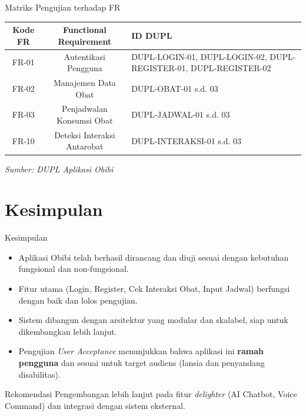 \documentclass[10pt, aspectratio=169]{beamer}
\begin{document}
\begin{frame}{Matriks Pengujian terhadap FR}
    \begin{table}[]
    \begin{tabular}{|c|c|p{}|}
        \hline
        \textbf{Kode FR} & \textbf{Functional Requirement} & \textbf{ID DUPL} \\
        \hline
        FR-01 & Autentikasi Pengguna & DUPL-LOGIN-01, DUPL-LOGIN-02, DUPL-REGISTER-01, DUPL-REGISTER-02 \\
        FR-02 & Manajemen Data Obat & DUPL-OBAT-01 s.d. 03 \\
        FR-03 & Penjadwalan Konsumsi Obat & DUPL-JADWAL-01 s.d. 03 \\
        FR-10 & Deteksi Interaksi Antarobat & DUPL-INTERAKSI-01 s.d. 03 \\
        \hline
    \end{tabular}
    \end{table}
    \vspace{0.5cm}
    \begin{flushright}
        \tiny{\textit{Sumber: DUPL Aplikasi Obibi}}
    \end{flushright}
\end{frame}

\section{Kesimpulan}

\begin{frame}{Kesimpulan}
    \begin{itemize}
        \item Aplikasi Obibi telah berhasil dirancang dan diuji sesuai dengan kebutuhan fungsional dan non-fungsional.
        \item Fitur utama (Login, Register, Cek Interaksi Obat, Input Jadwal) berfungsi dengan baik dan lolos pengujian.
        \item Sistem dibangun dengan arsitektur yang modular dan skalabel, siap untuk dikembangkan lebih lanjut.
        \item Pengujian \textit{User Acceptance} menunjukkan bahwa aplikasi ini \textbf{ramah pengguna} dan sesuai untuk target audiens (lansia dan penyandang disabilitas).
    \end{itemize}
    \vspace{0.5cm}
    \begin{block}{Rekomendasi}
        Pengembangan lebih lanjut pada fitur \textit{delighter} (AI Chatbot, Voice Command) dan integrasi dengan sistem eksternal.
    \end{block}
\end{frame}
\end{document}
